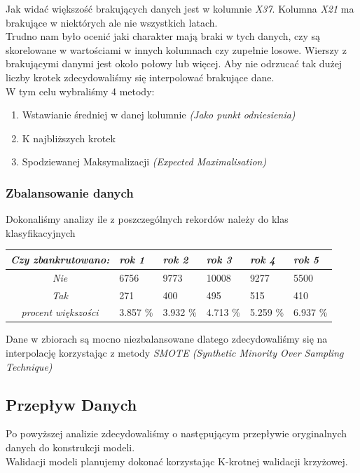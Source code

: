 \documentclass[11pt]{article}
\begin{document}
Jak widać większość brakujących danych jest w kolumnie \textit{X37}. Kolumna \textit{X21} ma brakujące w niektórych ale nie wszystkich latach.\\
Trudno nam było ocenić jaki charakter mają braki w tych danych, czy są skorelowane w wartościami w innych kolumnach czy zupełnie losowe. Wierszy z brakującymi danymi jest około połowy lub więcej. Aby nie odrzucać tak dużej liczby krotek zdecydowaliśmy się interpolować brakujące dane.\\
W tym celu wybraliśmy 4 metody:
\begin{enumerate}
	\item Wstawianie średniej w danej kolumnie \textit{(Jako punkt odniesienia)}
	\item K najbliższych krotek
	\item Spodziewanej Maksymalizacji \textit{(Expected Maximalisation)}
\end{enumerate}
\subsubsection{Zbalansowanie danych}
Dokonaliśmy analizy ile z poszczególnych rekordów należy do klas klasyfikacyjnych
\begin{center}
	\begin{tabular}{|c|m{0.7in}|m{0.7in}|m{0.7in}|m{0.7in}|m{0.7in}|}
		\hline
		\textit{Czy zbankrutowano:}& \textit{rok 1} & \textit{rok 2} & \textit{rok 3} & \textit{rok 4} & \textit{rok 5} \\ \hline
		\textit{Nie} & 6756 & 9773 & 10008 & 9277 & 5500 \\ \hline
		\textit{Tak} & 271 & 400 & 495 & 515 & 410 \\ \hline \hline
		\textit{procent większości} & 3.857 \% & 3.932 \% & 4.713 \% & 5.259 \% & 6.937 \% \\ \hline
	\end{tabular}
\end{center}
Dane w zbiorach są mocno niezbalansowane dlatego zdecydowaliśmy się na interpolację korzystając z metody \textit{SMOTE (Synthetic Minority Over Sampling Technique)}
\subsection{Przepływ Danych}
Po powyższej analizie zdecydowaliśmy o następującym przepływie oryginalnych danych do konstrukcji modeli.\\
Walidacji modeli planujemy dokonać korzystając K-krotnej walidacji krzyżowej.
\end{document}
